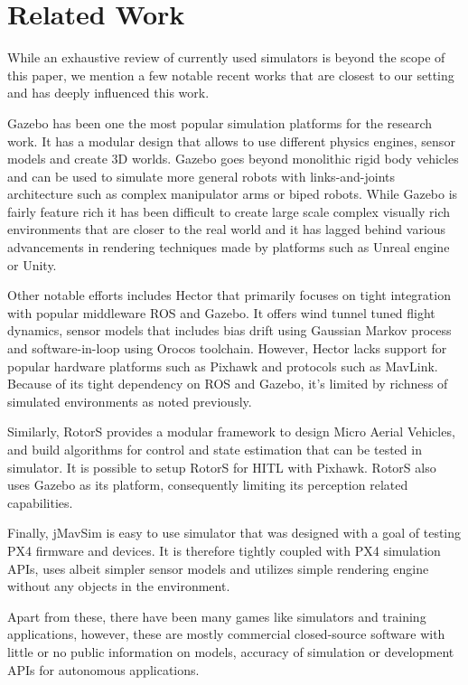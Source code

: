 \documentclass[graybox]{svmult}
\begin{document}
	\section{Related Work}
	While an exhaustive review of currently used simulators is beyond the scope of this paper, we mention a few notable recent works that are closest to our setting and has deeply influenced this work.
	
	Gazebo \cite{koenig2004design} has been one the most popular simulation platforms for the research work. It has a modular design that allows to use different physics engines, sensor models and create 3D worlds. Gazebo goes beyond monolithic rigid body vehicles and can be used to simulate more general robots with links-and-joints architecture such as complex manipulator arms or biped robots. While Gazebo is fairly feature rich it has been difficult to create large scale complex visually rich environments that are closer to the real world and it has lagged behind various advancements in rendering techniques made by platforms such as Unreal engine or Unity.
	
	Other notable efforts includes Hector \cite{meyer2012comprehensive} that primarily focuses on tight integration with popular middleware ROS and Gazebo. It offers wind tunnel tuned flight dynamics, sensor models that includes bias drift using Gaussian Markov process and software-in-loop using Orocos toolchain. However, Hector lacks support for popular hardware platforms such as Pixhawk and protocols such as MavLink. Because of its tight dependency on ROS and Gazebo, it's limited by richness of simulated environments as noted previously.
	
	Similarly, RotorS \cite{furrer2016rotors} provides a modular framework to design Micro Aerial Vehicles, and build algorithms for control and state estimation that can be tested in simulator. It is possible to setup RotorS for HITL with Pixhawk. RotorS also uses Gazebo as its platform, consequently limiting its perception related capabilities. 
	
	Finally, jMavSim \cite{jmavsim} is easy to use simulator that was designed with a goal of testing PX4 firmware and devices. It is therefore tightly coupled with PX4 simulation APIs, uses albeit simpler sensor models and utilizes simple rendering engine without any objects in the environment. 
	
	Apart from these, there have been many games like simulators and training applications, however, these are mostly commercial closed-source software with little or no public information on models, accuracy of simulation or development APIs for autonomous applications.
	
\end{document}
